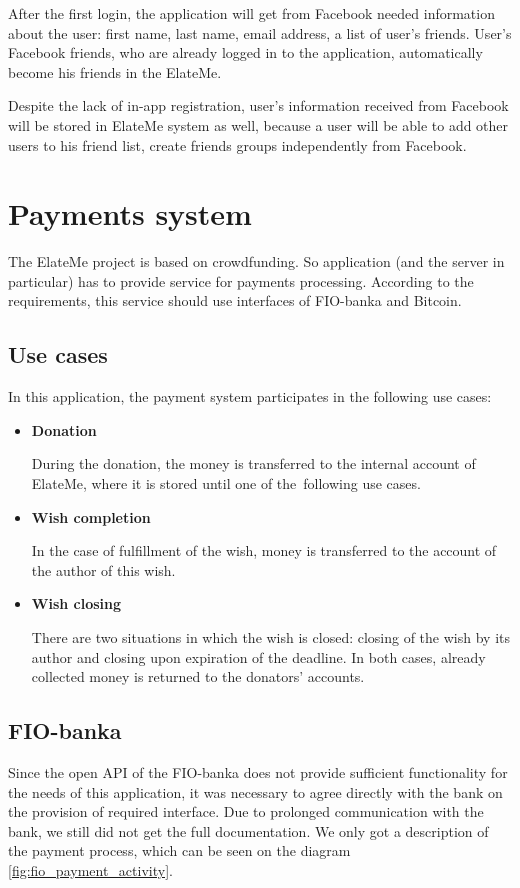 After the first login, the application will get from Facebook needed infor\-mation about the user: first name, last
name, email address, a list of user's friends. User's Facebook friends, who are already logged in to the application,
automatically become his friends in the ElateMe.

Despite the lack of in-app registration, user's information received from Facebook will be stored in ElateMe system as
well, because a user will be able to add other users to his friend list, create friends groups independently from
Facebook.



\newcommand{\uitem}[1]{
\item \textbf{#1} \par
}
\newcommand{\aitem}[1]{
\item \textbf{#1} \par
}
\section{Payments system}
The ElateMe project is based on crowdfunding. So application (and the server in particular) has to provide service for
payments processing. According to the requirements, this service should use interfaces of FIO-banka and Bitcoin.

\subsection{Use cases}
In this application, the payment system participates in the following use cases:

\begin{itemize}
\uitem{Donation}
During the donation, the money is transferred to the internal account of ElateMe, where it is stored until one of
the~following use cases.

\uitem{Wish completion}
In the case of fulfillment of the wish, money is transferred to the account of the author of this wish.

\uitem{Wish closing}
There are two situations in which the wish is closed: closing of the wish by its author and closing upon expiration of
the deadline. In both cases, already collected money is returned to the donators' accounts.
\end{itemize}

\subsection{FIO-banka}
Since the open \ac{API} of the FIO-banka \cite{fio} does not provide sufficient functionality for the needs of this
application, it was necessary to agree directly with the bank on the provision of required interface. Due to prolonged
communication with the bank, we still did not get the full documentation. We only got a description of the payment
process, which can be seen on the diagram \ref{fig:fio_payment_activity}.

